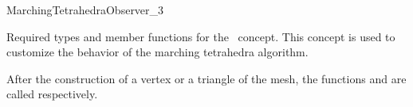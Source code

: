 
\ccRefPageBegin



\begin{ccRefConcept}{MarchingTetrahedraObserver_3}

  Required types and member functions for the \ccRefName\ concept.
  This concept is used to customize the behavior of the marching
  tetrahedra algorithm.

  After the construction of a vertex or a triangle of the mesh, the
  functions  and
   are called respectively.

\ccRefines
  
\ccTypes



\ccCreation
{}


\ccOperations


\ccHasModels


\end{ccRefConcept}

\ccRefPageEnd

